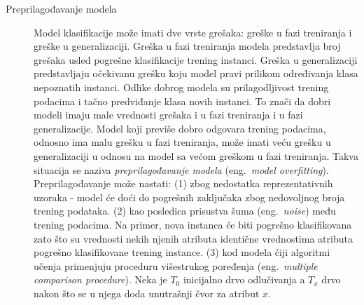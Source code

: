 \documentclass[12pt,oneside]{memoir}
\begin{document}
\begin{description}
\item[Preprilagođavanje modela] Model klasifikacije može imati dve vrste grešaka: greške u fazi treniranja i greške u generalizaciji. Greška u fazi treniranja modela predstavlja broj grešaka usled pogrešne klasifikacije trening instanci. Greška u generalizaciji predstavljaju očekivanu grešku koju model pravi prilikom određivanja klasa nepoznatih instanci. Odlike dobrog modela su prilagodljivost trening podacima i tačno predviđanje klasa novih instanci. To znači da dobri modeli imaju male vrednosti grešaka i u fazi treniranja i u fazi generalizacije. Model koji previše dobro odgovara trening podacima, odnosno ima malu grešku u fazi treniranja, može imati veću grešku u generalizaciji u odnosu na model sa većom greškom u fazi treniranja. Takva situacija se naziva \textit{preprilagođavanje modela} (eng.~\textit{model overfitting}). Preprilagođavanje može nastati: (1) zbog nedostatka reprezentativnih uzoraka - model će doći do pogrešnih zaključaka zbog nedovoljnog broja trening podataka. (2) kao posledica prisustva šuma (eng.~\textit{noise}) među trening podacima. Na primer, nova instanca će biti pogrešno klasifikovana zato što su vrednosti nekih njenih atributa identične vrednostima atributa pogrešno klasifikovane trening instance.  (3) kod modela čiji algoritmi učenja primenjuju proceduru višestrukog poređenja (eng.~\textit{multiple comparison procedure}). Neka je $T_0$ inicijalno drvo odlučivanja a $T_x$ drvo nakon što se u njega doda unutrašnji čvor za atribut $x$. %

\end{description}
\end{document}
